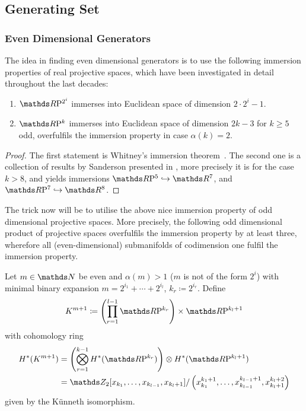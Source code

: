 \subsection{Generating Set}
\subsubsection{Even Dimensional Generators}
The idea in finding even dimensional generators is to use the
following immersion properties of real projective spaces, which have
been investigated in detail throughout the last decades:
\begin{Lem}\label{lem:immersionrealprojspace}
  \begin{enumerate}
  \item
    $\RP{2^i}$ immerses into Euclidean space of dimension
    $2\cdot2^i-1$.
  \item
    $\RP{k}$ immerses into Euclidean space of dimension
    $2k-3$ for $k\geq 5$ odd, \idest overfulfils the immersion
    property in case $\alpha(k)=2$.
  \end{enumerate}
  \begin{proof}
    The first statement is Whitney's immersion
    theorem~\cite{whitneyimmersiontheorem}.
    The second one is a collection of results by Sanderson
    presented in \cite{sanderson}, more precisely it is
    \cite[Theorem~(5.3)]{sanderson} for the case $k>8$, and
    \cite[Theorem~(4.1)]{sanderson} yields immersions
    $\RP 5\immto\R^7$, and $\RP 7\immto\R^8$.
  \end{proof}
\end{Lem}
The trick now will be to utilise the above nice immersion property of
odd dimensional projective spaces. More precisely, the following odd
dimensional product of projective spaces overfulfils the immersion
property by at least three, wherefore all (even-dimensional)
submanifolds of codimension one fulfil the immersion property.
\begin{Def}
  Let $m\in\Nat$ be even and $\alpha(m)>1$ (\idest $m$ is not of the
  form $2^{i}$) with minimal binary expansion 
  $m=2^{i_1}+\dotsb+2^{i_l}$, $k_r\coloneqq 2^{i_r}$.
  Define
  \begin{gather*}
    K^{m+1}\coloneqq \left(\prod_{r=1}^{l-1} \RP{k_r}\right) \times \RP{k_l+1}
  \end{gather*}
  with cohomology ring
  \begin{align*}
    \H^*(K^{m+1})
    &= \left(\bigotimes_{r=1}^{k-1}\H^*(\RP{k_r})\right)
      \otimes \H^*(\RP{k_l+1}) \\
    &= \Zmod2[x_{k_1},\dotsc,x_{k_{l-1}}, x_{k_l+1}]/
      \left( x_{k_1}^{k_1+1},\dotsc,x_{k_{l-1}}^{k_{l-1}+1},
      x_{k_l+1}^{k_l+2} \right)
  \end{align*}
  given by the Künneth isomorphism.
\end{Def}
